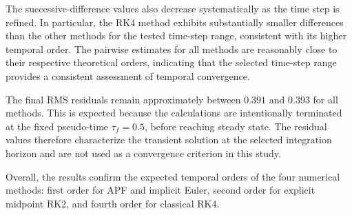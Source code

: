 The successive-difference values also decrease systematically
as the time step is refined. In particular, the RK4 method
exhibits substantially smaller differences than the other
methods for the tested time-step range, consistent with its
higher temporal order. The pairwise estimates for all methods
are reasonably close to their respective theoretical orders,
indicating that the selected time-step range provides a
consistent assessment of temporal convergence.

The final RMS residuals remain approximately between
$0.391$ and $0.393$ for all methods. This is expected because
the calculations are intentionally terminated at the fixed
pseudo-time $\tau_f=0.5$, before reaching steady state.
The residual values therefore characterize the transient
solution at the selected integration horizon and are not
used as a convergence criterion in this study.

Overall, the results confirm the expected temporal orders
of the four numerical methods: first order for APF and
implicit Euler, second order for explicit midpoint RK2,
and fourth order for classical RK4.